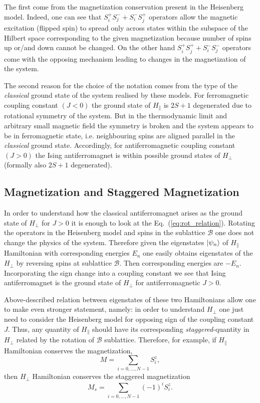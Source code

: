 \documentclass[12pt, a4paper]{article}
\begin{document}
The first come from the magnetization conservation present in the Heisenberg model. Indeed, one can see that $S_i^+ S_j^- + S_i^- S_j^+$ operators allow the magnetic excitation (flipped spin) to spread only across states within the subspace of the Hilbert space corresponding to the given magnetization because number of spins up or/and down cannot be changed. On the other hand $S_i^+ S_j^+ + S_i^- S_j^-$ operators come with the opposing mechanism leading to changes in the magnetization of the system. 

The second reason for the choice of the notation comes from the type of the \textit{classical} ground state of the system realised by these models. For ferromagnetic coupling constant $(J < 0)$ the ground state of $H_{\parallel}$ is $2S+1$ degenerated due to rotational symmetry of the system. But in the thermodynamic limit and arbitrary small magnetic field the symmetry is broken and the system appears to be in ferromagnetic state, i.e. neighbouring spins are aligned parallel in the \textit{classical} ground state. Accordingly, for antiferromagnetic coupling constant $(J > 0)$ the Ising antiferromagnet is within possible ground states of $H_{\perp}$ (formally also $2S+1$ degenerated).

\subsection{Magnetization and Staggered Magnetization}
In order to understand how the classical antiferromagnet arises as the ground state of $H_{\perp}$ for $J > 0$ it is enough to look at the Eq.~(\ref{eq:rot_relation}). Rotating the operators in the Heisenberg model and spins in the sublattice $\mathcal{B}$ one does not change the physics of the system. Therefore given the eigenstates $\ket{\psi_n}$ of $H_{\parallel}$ Hamiltonian with corresponding energies $E_n$ one easily obtains eigenstates of the $H_{\perp}$ by reversing spins at sublattice $\mathcal{B}$. Then corresponding energies are $-E_n$. Incorporating the sign change into a coupling constant we see that Ising antiferromagnet is the ground state of $H_{\perp}$ for antiferromagnetic $J > 0$. 

Above-described relation between eigenstates of these two Hamiltonians allow one to make even stronger statement, namely: in order to understand $H_{\perp}$ one just need to consider the Heisenberg model for opposing sign of the coupling constant $J$. Thus, any quantity of $H_{\parallel}$ should have its corresponding \textit{staggered}-quantity in $H_{\perp}$ related by the rotation of $\mathcal{B}$ sublattice. Therefore, for example, if $H_{\parallel}$ Hamiltonian conserves the magnetization,
\begin{equation}
M = \sum_{i = 0,\hdots,N-1} S_i^z,
\end{equation}
then $H_{\perp}$ Hamiltonian conserves the staggered magnetization
\begin{equation}
M_s = \sum_{i = 0,\hdots,N-1} (-1)^i S_i^z.
\end{equation}
\end{document}
